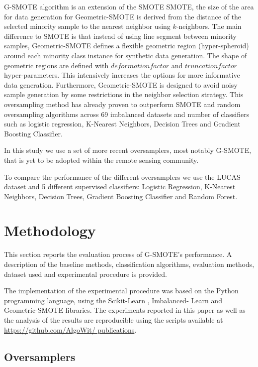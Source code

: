 \documentclass[remotesensing,article,submit,moreauthors,pdftex]{Definitions/mdpi}
\begin{document}
G-SMOTE algorithm is an extension of the SMOTE SMOTE, the size of the area for
data generation for Geometric-SMOTE is derived from the distance of the selected
minority sample to the nearest neighbor using $k$-neighbors. The main difference
to SMOTE is that instead of using line segment between minority samples,
Geometric-SMOTE defines a flexible geometric region (hyper-spheroid) around each
minority class instance for synthetic data generation. The shape of geometric
regions are defined with $deformation factor$ and $truncation factor$
hyper-parameters. This intensively increases the options for more informative
data generation. Furthermore, Geometric-SMOTE is designed to avoid noisy sample
generation by some restrictions in the neighbor selection strategy. This
oversampling method has already proven to outperform SMOTE and random
oversampling algorithms across 69 imbalanced datasets and number of classifiers
such as logistic regression, K-Nearest Neighbors, Decision Trees and Gradient
Boosting Classifier.

In this study we use a set of more recent oversamplers, most notably G-SMOTE,
that is yet to be adopted within the remote sensing community.

To compare the performance of the different oversamplers we use the LUCAS
dataset and 5 different supervised classifiers: Logistic Regression, K-Nearest
Neighbors, Decision Trees, Gradient Boosting Classifier and Random Forest.

\section{Methodology}

This section reports the evaluation process of G-SMOTE's performance. A
description of the baseline methods, classification algorithms, evaluation
methods, dataset used and experimental procedure is provided.

The implementation of the experimental procedure was based on the Python
programming language, using the Scikit-Learn \cite{Pedregosa2011}, Imbalanced-
Learn \cite{JMLR:v18:16-365} and Geometric-SMOTE \cite{Douzas2019} libraries.
The experiments reported in this paper as well as the analysis of the results
are reproducible using the scripts available at \url{https://github.com/AlgoWit/
publications}.

\subsection{Oversamplers}
\end{document}
